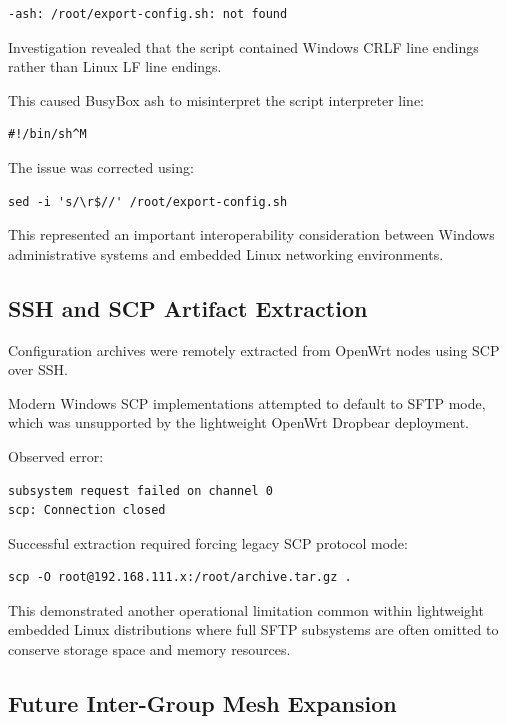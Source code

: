\documentclass[conference]{IEEEtran}
\begin{document}
\begin{verbatim}
-ash: /root/export-config.sh: not found
\end{verbatim}

Investigation revealed that the script contained Windows CRLF line endings rather than Linux LF line endings.

This caused BusyBox ash to misinterpret the script interpreter line:

\begin{verbatim}
#!/bin/sh^M
\end{verbatim}

The issue was corrected using:

\begin{verbatim}
sed -i 's/\r$//' /root/export-config.sh
\end{verbatim}

This represented an important interoperability consideration between Windows administrative systems and embedded Linux networking environments.

\subsection{SSH and SCP Artifact Extraction}

Configuration archives were remotely extracted from OpenWrt nodes using SCP over SSH.

Modern Windows SCP implementations attempted to default to SFTP mode, which was unsupported by the lightweight OpenWrt Dropbear deployment.

Observed error:

\begin{verbatim}
subsystem request failed on channel 0
scp: Connection closed
\end{verbatim}

Successful extraction required forcing legacy SCP protocol mode:

\begin{verbatim}
scp -O root@192.168.111.x:/root/archive.tar.gz .
\end{verbatim}

This demonstrated another operational limitation common within lightweight embedded Linux distributions where full SFTP subsystems are often omitted to conserve storage space and memory resources.

\subsection{Future Inter-Group Mesh Expansion}
\end{document}
